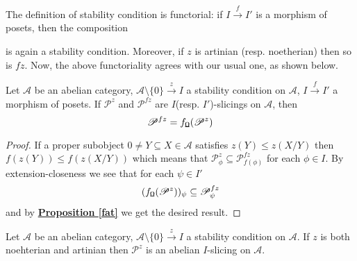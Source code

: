 The definition of stability condition is functorial: if $I \overset{f}{\longrightarrow} I'$ is a morphism of posets, then the composition 

\begin{center}
\end{center}

is again a stability condition. Moreover, if $z$ is artinian (resp. noetherian) then so is $fz$. Now, the above functoriality agrees with our usual one, as shown below. 

\begin{prop}
  Let $\mathscr{A}$ be an abelian category, $\mathscr{A} \setminus \{ 0 \} \overset{z}{\longrightarrow} I$ a stability condition on $\mathscr{A}$, $I \overset{f}{\longrightarrow} I'$ a morphism of posets. If $\mathscr{P}^z$ and $\mathscr{P}^{fz}$ are $I$(resp. $I'$)-slicings on $\mathscr{A}$, then $$\mathscr{P}^{fz}=f_{\textnormal{\Libra}}(\mathscr{P}^z)$$ 
\end{prop}

\begin{proof}
 If a proper subobject $0 \not = Y \subseteq X \in \mathscr{A}$ satisfies $z(Y) \le z(X/Y)$ then $f(z(Y)) \le f(z(X/Y))$ which means that $\mathscr{P}_{\phi}^z \subseteq \mathscr{P}_{f(\phi)}^{fz}$ for each $\phi \in I$. By extension-closeness we see that for each $\psi \in I'$ $$(f_{\textnormal{\Libra}}(\mathscr{P}^z))_{\psi} \subseteq \mathscr{P}_{\psi}^{fz} $$
 and by \hyperref[fat]{\textbf{Proposition \ref*{fat}}} we get the desired result. 
\end{proof}

\begin{prop}\label{gies}
Let $\mathscr{A}$ be an abelian category, $\mathscr{A} \setminus \{ 0 \} \overset{z}{\longrightarrow} I$ a stability condition on $\mathscr{A}$. If $z$ is both noehterian and artinian then $\mathscr{P}^z$ is an abelian $I$-slicing on $\mathscr{A}$. 
\end{prop}

